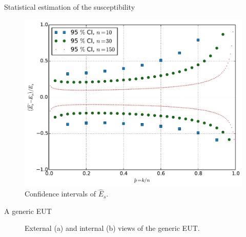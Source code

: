 \documentclass[final,hyperref={pdfpagelabels=false}]{beamer}
\begin{document}
\begin{frame}{}
\begin{columns}[t]
\begin{column}{0.32\linewidth}
\begin{block}{Statistical estimation of the susceptibility}
\vspace{-0.6cm}
\begin{figure}
\centering
\includegraphics[trim=0 0 0 0,clip,width=0.8\columnwidth]{./img/figErrbc}
\vspace{-0.3cm}
\large{\caption{Confidence intervals of $\hat{E}_s$.}}
\end{figure}
      \end{block}


      \begin{block}{A generic EUT}
\vspace{-0.6cm}
      \begin{figure}
     \centering
     \vspace{-0.3cm}
\large{\caption{External (a) and internal (b) views of the generic EUT.}}
     \label{fig_diags}
\end{figure}
\vspace{-0.2cm}


\end{block}
\end{column}
\end{columns}
\end{frame}
\end{document}
